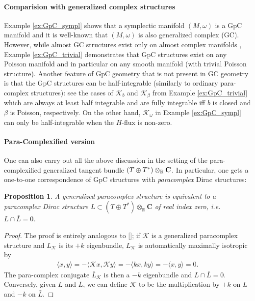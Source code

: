 \documentclass[letterpaper,12pt]{article}
\newcommand{\TT}{{T\oplus T^*}}
\newcommand{\KK}{\mathcal{K}}
\newcommand{\RR}{\mathbb{R}}
\newtheorem{proposition}[theorem]{Proposition}
\theoremstyle{definition}
\theoremstyle{remark}
\theoremstyle{examples}
\begin{document}
\paragraph{Comparision with generalized complex structures}
Example \ref{ex:GpC_sympl} shows that a symplectic manifold $(M,\omega)$ is a GpC manifold and it is well-known \cite{Gualtieri:2003dx} that $(M,\omega)$ is also generalized complex (GC). However, while almost GC structures exist only on almost complex manifolds \cite{Gualtieri:2003dx}, Example \ref{ex:GpC_trivial} demonstrates that GpC structures exist on any Poisson manifold and in particular on any smooth manifold (with trivial Poisson structure). Another feature of GpC geometry that is not present in GC geometry is that the GpC structures can be half-integrable (similarly to ordinary para-complex structures): see the cases of $\KK_b$ and $\KK_\beta$ from Example \ref{ex:GpC_trivial} which are always at least half integrable and are fully integrable iff $b$ is closed and $\beta$ is Poisson, respectively. On the other hand, $\KK_\omega$ in Example \ref{ex:GpC_sympl} can only be half-integrable when the $H$-flux is non-zero.


\paragraph{Para-Complexified version}
One can also carry out all the above discussion in the setting of the para-complexified generalized tangent bundle $(\TT)\otimes_\RR \Cp$. In particular, one gets a one-to-one correspondence of GpC structures with {\it paracomplex} Dirac structures:
\begin{proposition}\label{prop: pcomplexified}
A generalized paracomplex structure is equivalent to a paracomplex Dirac structure $L \subset (\TT)\otimes_\mathbb{R} \mathbf{C}$ of real index zero, i.e. $L \cap \bar{L}=0$.
\end{proposition}
\begin{proof}
The proof is entirely analogous to []; if $\KK$ is a generalized paracomplex structure and $L_\KK$ is its $+k$ eigenbundle, $L_\KK$ is automatically maximally isotropic by 
\begin{align*}
\langle x,y \rangle = -\langle\KK x,\KK y \rangle = -\langle k x,k y \rangle = -\langle x,y\rangle=0.
\end{align*}
The para-complex conjugate $\bar{L}_\KK$ is then a $-k$ eigenbundle and $L\cap\bar{L}=0$. Conversely, given $L$ and $\bar{L}$, we can define $\KK$ to be the multiplication by $+k$ on $L$ and $-k$ on $\bar{L}$.
\end{proof}
\end{document}
